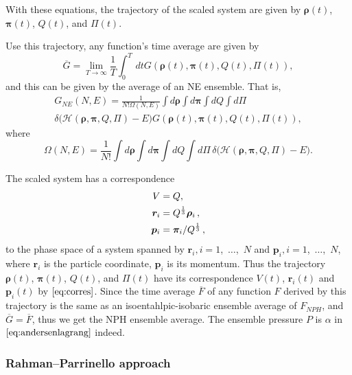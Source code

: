 With these equations, the trajectory of the scaled system are given by
$\bm{\rho}(t)$, $\bm{\pi}(t)$, $Q(t)$, and $\Pi(t)$.

Use this trajectory, any function's time average are given by
\begin{equation}
	\overline{G} = \lim_{T \rightarrow \infty} \frac{ 1 }{ T } \int_{0}^{T}  \, dt
	G(\bm{\rho}(t), \bm{\pi}(t), Q(t), \Pi(t)),
\end{equation}
and this can be given by the average of an NE ensemble. That is,
\begin{multline}
	G_{NE} (N, E) = \frac{ 1 }{ N! \Omega(N,E) } \int d\bm{\rho} \int d\bm{\pi}
	\int dQ \int d\Pi \\
	\delta \big( \mathcal{H}(\bm{\rho}, \bm{\pi}, Q, \Pi)
	- E \big) G(\bm{\rho}(t), \bm{\pi}(t), Q(t), \Pi(t)),
\end{multline}
where
\begin{equation}
	\Omega(N, E) = \frac{ 1 }{ N! }  \int d\bm{\rho} \int d\bm{\pi}
	\int dQ \int d\Pi \, \delta \big( \mathcal{H}(\bm{\rho}, \bm{\pi}, Q, \Pi)
	- E \big).
\end{equation}

The scaled system has a correspondence
\begin{align}\label{eq:corres}
	V        & = Q,                                           \\
	\bm{r}_i & = Q^{\frac{ 1 }{ 3 }} \bm{\rho}_i \thinspace,  \\
	\bm{p}_i & = \bm{\pi}_i / Q^{\frac{ 1 }{ 3 }} \thinspace,
\end{align}
to the phase space of a system spanned by
$\bm{r}_i, i=1$,~$\ldots$,~$N$ and
$\bm{p}_i, i=1$,~$\ldots$,~$N$,
where $\bm{r}_i$ is the particle coordinate, $\bm{p}_i$ is its momentum.
Thus the trajectory
$\bm{\rho}(t)$, $\bm{\pi}(t)$, $Q(t)$, and $\Pi(t)$ have its
correspondence $V(t)$, $\bm{r}_i(t)$ and $\bm{p}_i(t)$ by
$\eqref{eq:corres}$.
Since the time average $\overline{F}$ of any function $F$
derived by this trajectory is the same as an
isoentahlpic-isobaric ensemble average of $F_{NPH}$, and
$\overline{G} = \overline{F}$, thus we get the NPH ensemble average.
The ensemble pressure $P$ is $\alpha$ in $\eqref{eq:andersenlagrang}$ indeed.


\subsubsection{Rahman--Parrinello approach}
\label{sssec:rpa}

